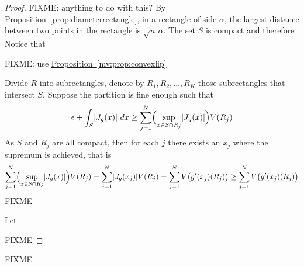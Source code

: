 \documentclass[12pt]{book}
\newcommand{\sabs}[1]{\lvert {#1} \rvert}
\newcommand{\R}{{\mathbb{R}}}
\theoremstyle{plain}
\newtheorem{lemma}[thm]{Lemma}
\theoremstyle{remark}
\theoremstyle{definition}
\theoremstyle{exercise}
\theoremstyle{example}
\newcommand{\propref}[1]{\hyperref[#1]{Proposition~\ref*{#1}}}
\begin{document}
\begin{proof}
FIXME: anything to do with this?
By \propref{prop:diameterrectangle},
in a rectangle of side $\alpha$, the largest distance 
between two points in the rectangle is $\sqrt{n} \, \alpha$.
The set $S$ is compact and therefore 
Notice that 

FIXME: use
\propref{mv:prop:convexlip}





Divide $R$ into
subrectangles, denote
by $R_1,R_2,\ldots,R_K$ those subrectangles that intersect $S$.
Suppose the partition is fine enough such that
\begin{equation*}
\epsilon + \int_S \sabs{J_g(x)} ~ dx \geq
\sum_{j=1}^N \Bigl(\sup_{x \in S \cap R_j} \sabs{J_g(x)} \Bigr) V(R_j)
\end{equation*}
As $S$ and $R_j$ are all compact, then for each $j$ there exists an $x_j$
where the supremum is achieved, that is
\begin{equation*}
\sum_{j=1}^N \Bigl(\sup_{x \in S \cap R_j} \sabs{J_g(x)} \Bigr) V(R_j)
=
\sum_{j=1}^N \sabs{J_g(x_j)}  V(R_j)
=
\sum_{j=1}^N V\bigl(g'(x_j) (R_j)\bigr)
\geq
\sum_{j=1}^N V\bigl(g'(x_j) (R_j)\bigr)
\end{equation*}
FIXME



Let 






FIXME
\end{proof}


FIXME
\end{document}
